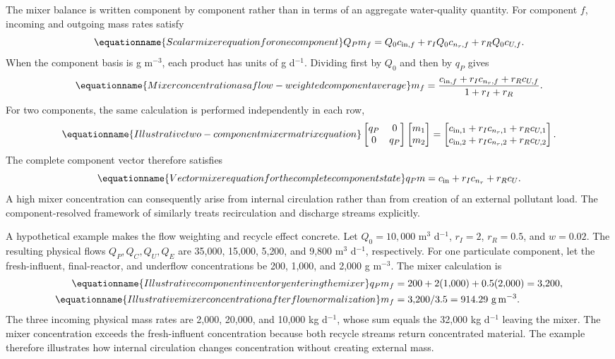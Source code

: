 The mixer balance is written component by component rather than in terms of an aggregate water-quality quantity. For component $f$, incoming and outgoing mass rates satisfy
\begin{equation}
\equationname{Scalar mixer equation for one component}
Q_Pm_f=Q_0c_{{\rm in},f}+r_IQ_0c_{n_r,f}+r_RQ_0c_{U,f}.
\end{equation}
When the component basis is g m$^{-3}$, each product has units of g d$^{-1}$. Dividing first by $Q_0$ and then by $q_P$ gives
\begin{equation}
\equationname{Mixer concentration as a flow-weighted component average}
m_f=\frac{c_{{\rm in},f}+r_Ic_{n_r,f}+r_Rc_{U,f}}{1+r_I+r_R}.
\end{equation}
For two components, the same calculation is performed independently in each row,
\begin{equation}
\equationname{Illustrative two-component mixer matrix equation}
\begin{bmatrix}q_P&0\\0&q_P\end{bmatrix}
\begin{bmatrix}m_1\\m_2\end{bmatrix}
=\begin{bmatrix}c_{{\rm in},1}+r_Ic_{n_r,1}+r_Rc_{U,1}\\
c_{{\rm in},2}+r_Ic_{n_r,2}+r_Rc_{U,2}\end{bmatrix}.
\end{equation}
The complete component vector therefore satisfies
\begin{equation}
\equationname{Vector mixer equation for the complete component state}
q_Pm=c_{\rm in}+r_Ic_{n_r}+r_Rc_U.
\label{eq:plant_mixer}
\end{equation}
A high mixer concentration can consequently arise from internal circulation rather than from creation of an external pollutant load. The component-resolved framework of \citet{Zhang2026} similarly treats recirculation and discharge streams explicitly.

A hypothetical example makes the flow weighting and recycle effect concrete. Let $Q_0=10{,}000$ m$^3$ d$^{-1}$, $r_I=2$, $r_R=0.5$, and $w=0.02$. The resulting physical flows $Q_P,Q_C,Q_U,Q_E$ are 35{,}000, 15{,}000, 5{,}200, and 9{,}800 m$^3$ d$^{-1}$, respectively. For one particulate component, let the fresh-influent, final-reactor, and underflow concentrations be 200, 1{,}000, and 2{,}000 g m$^{-3}$. The mixer calculation is
\begin{align}
\equationname{Illustrative component inventory entering the mixer}
q_Pm_f&=200+2(1{,}000)+0.5(2{,}000)=3{,}200,\\
\equationname{Illustrative mixer concentration after flow normalization}
m_f&=3{,}200/3.5=914.29\ \mathrm{g\,m^{-3}}.
\end{align}
The three incoming physical mass rates are 2{,}000, 20{,}000, and 10{,}000 kg d$^{-1}$, whose sum equals the 32{,}000 kg d$^{-1}$ leaving the mixer. The mixer concentration exceeds the fresh-influent concentration because both recycle streams return concentrated material. The example therefore illustrates how internal circulation changes concentration without creating external mass.

